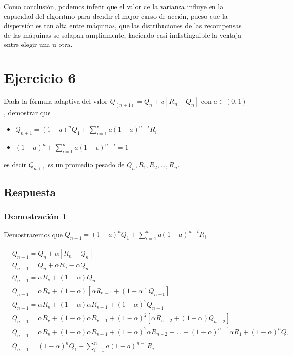 \documentclass[12pt,a4paper]{article}
\begin{document}
Como conclusión, podemos inferir que el valor de la varianza influye en la capacidad
del algoritmo para decidir el mejor curso de acción, pueso que la dispersión es tan
alta entre máquinas, que las distribuciones de las recompensas de las máquinas
se solapan ampliamente, haciendo casi indistinguible la ventaja entre elegir una 
u otra.

\section{Ejercicio 6}

Dada la fórmula adaptiva del valor $Q_(n+1) = Q_n + a[R_n - Q_n]$ con $a \in (0,1)$,
demostrar que
\begin{itemize}
\item $Q_{n+1} = (1-a)^n Q_1 + \sum_{i=1}^{n} a(1-a)^{n-i}R_i$
\item $(1-a)^n+ \sum_{i=1}^{n} a(1-a)^{n-i} = 1$
\end{itemize}
es decir $Q_{n+1}$ es un promedio pesado de $Q_n,R_1,R_2,...,R_n$.

\subsection{Respuesta}

\subsubsection{Demostración 1}

Demostraremos que $ Q_{n+1} = (1-a)^n Q_1 + \sum_{i=1}^{n} a(1-a)^{n-i}R_i $

\begin{align}
\tag{1} & Q_{n+1} = Q_n + \alpha[R_n - Q_n] \\
\tag{2} & Q_{n+1} = Q_n + \alpha R_n - \alpha Q_n \\
\tag{3} & Q_{n+1} = \alpha R_n + (1-\alpha) Q_n \\
\tag{4} & Q_{n+1} = \alpha R_n + (1-\alpha) [\alpha R_{n-1} + (1-\alpha) Q_{n-1}] \\
\tag{5} & Q_{n+1} = \alpha R_n + (1-\alpha) \alpha R_{n-1} + (1-\alpha)^2 Q_{n-1} \\
\tag{6} & Q_{n+1} = \alpha R_n + (1-\alpha) \alpha R_{n-1} + (1-\alpha)^2 [\alpha R_{n-2} + (1-\alpha) Q_{n-2}] \\
\tag{7} & Q_{n+1} = \alpha R_n + (1-\alpha) \alpha R_{n-1} + (1-\alpha)^2 \alpha R_{n-2}+\dots+(1-\alpha)^{n-1} \alpha R_1 + (1-\alpha)^n Q_1 \\
\tag{8} & Q_{n+1} = (1-\alpha)^n Q_1 + \sum_{i=1}^{n} a(1-a)^{n-i}R_i
\end{align}
\end{document}
